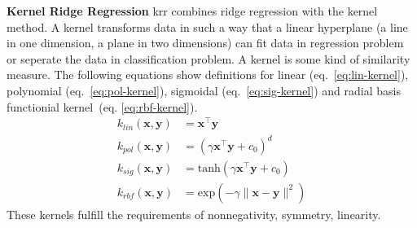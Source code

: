 \textbf{Kernel Ridge Regression}
\gls{krr} combines ridge regression with the kernel method. 
A kernel transforms data in such a way that a linear hyperplane (a line in one dimension, 
a plane in two dimensions) can fit data in regression problem or seperate the data in classification problem. 
A kernel is some kind of similarity measure. 
The following equations show definitions for 
linear (eq.~\ref{eq:lin-kernel}), 
polynomial (eq.~\ref{eq:pol-kernel}), 
sigmoidal (eq.~\ref{eq:sig-kernel}) and 
radial basis functionial kernel~(eq. \ref{eq:rbf-kernel}).
\begin{align}
    \label{eq:lin-kernel}
    k_{lin}(\mathbf{x},\mathbf{y}) &= \mathbf{x}^{\top} \mathbf{y} \\
    \label{eq:pol-kernel}
    k_{pol}(\mathbf{x}, \mathbf{y}) &= (\gamma \mathbf{x}^{\top} \mathbf{y} + c_0)^d \\
    \label{eq:sig-kernel}
    k_{sig}(\mathbf{x}, \mathbf{y}) &= \text{tanh}(\gamma \mathbf{x}^{\top} \mathbf{y} + c_0) \\
    \label{eq:rbf-kernel}
    k_{rbf}(\mathbf{x}, \mathbf{y}) &= \text{exp}(- \gamma \| \mathbf{x} -  \mathbf{y} \|^2) 
\end{align}
These kernels fulfill the requirements of nonnegativity, symmetry, linearity\cite{rupp2015machine}.
%
%

